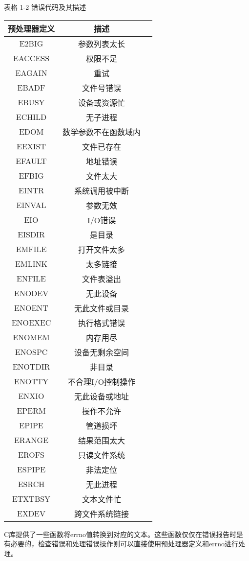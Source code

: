 \begin{flushleft}
表格 1-2 错误代码及其描述
\end{flushleft}
\begin{flushleft}
\begin{tabular}{ccc}
\toprule [1pt]
\rowcolor[gray]{.9}
\textbf{预处理器定义}&\textbf{描述}\\
\midrule
E2BIG&参数列表太长\\
EACCESS&权限不足\\
EAGAIN&重试\\
EBADF&文件号错误\\
EBUSY&设备或资源忙\\
ECHILD&无子进程\\
EDOM&数学参数不在函数域内\\
EEXIST&文件已存在\\
EFAULT&地址错误\\
EFBIG&文件太大\\
EINTR&系统调用被中断\\
EINVAL&参数无效\\
EIO&I/O错误\\
EISDIR&是目录\\
EMFILE&打开文件太多\\
EMLINK&太多链接\\
ENFILE&文件表溢出\\
ENODEV&无此设备\\
ENOENT&无此文件或目录\\
ENOEXEC&执行格式错误\\
ENOMEM&内存用尽\\
ENOSPC&设备无剩余空间\\
ENOTDIR&非目录\\
ENOTTY&不合理I/O控制操作\\
ENXIO&无此设备或地址\\
EPERM&操作不允许\\
EPIPE&管道损坏\\
ERANGE&结果范围太大\\
EROFS&只读文件系统\\
ESPIPE&非法定位\\
ESRCH&无此进程\\
ETXTBSY&文本文件忙\\
EXDEV&跨文件系统链接\\
\bottomrule[1pt]
\end{tabular}
\end{flushleft}

C库提供了一些函数将errno值转换到对应的文本。这些函数仅仅在错误报告时是有必要的，检查错误和处理错误操作则可以直接使用预处理器定义和errno进行处理。


